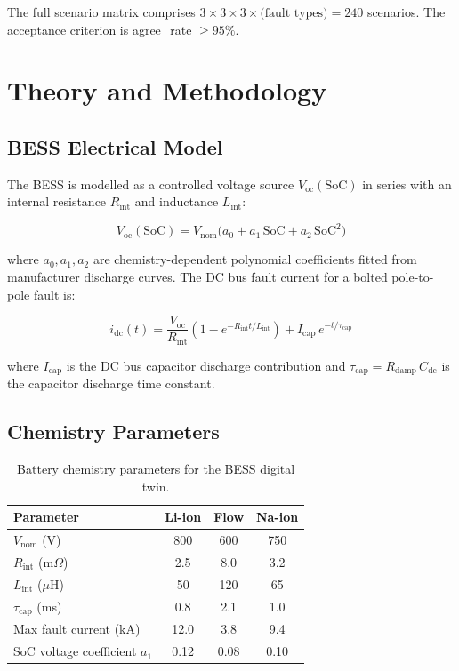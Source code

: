 \documentclass[11pt, a4paper]{article}
\begin{document}
The full scenario matrix comprises $3 \times 3 \times 3 \times \text{(fault types)}
= 240$ scenarios. The acceptance criterion is agree\_rate $\geq 95\%$.

\section{Theory and Methodology}
\label{sec:theory}

\subsection{BESS Electrical Model}

The BESS is modelled as a controlled voltage source $V_{\mathrm{oc}}(\mathrm{SoC})$
in series with an internal resistance $R_{\mathrm{int}}$ and inductance $L_{\mathrm{int}}$:

\begin{equation}
  V_{\mathrm{oc}}(\mathrm{SoC}) = V_{\mathrm{nom}}\bigl(a_0 + a_1\,\mathrm{SoC}
    + a_2\,\mathrm{SoC}^2\bigr)
  \label{eq:voc}
\end{equation}

\noindent where $a_0, a_1, a_2$ are chemistry-dependent polynomial coefficients
fitted from manufacturer discharge curves. The DC bus fault current for a
bolted pole-to-pole fault is:

\begin{equation}
  i_{\mathrm{dc}}(t) = \frac{V_{\mathrm{oc}}}{R_{\mathrm{int}}}
    \left(1 - e^{-R_{\mathrm{int}} t / L_{\mathrm{int}}}\right)
    + I_{\mathrm{cap}}\,e^{-t/\tau_{\mathrm{cap}}}
  \label{eq:dc_fault}
\end{equation}

\noindent where $I_{\mathrm{cap}}$ is the DC bus capacitor discharge contribution
and $\tau_{\mathrm{cap}} = R_{\mathrm{damp}}\,C_{\mathrm{dc}}$ is the capacitor
discharge time constant.

\subsection{Chemistry Parameters}

\begin{table}[ht]
\centering
\caption{Battery chemistry parameters for the BESS digital twin.}
\label{tab:chemistry}
\begin{tabular}{lccc}
\toprule
Parameter & Li-ion & Flow & Na-ion \\
\midrule
$V_{\mathrm{nom}}$ (V) & 800 & 600 & 750 \\
$R_{\mathrm{int}}$ (m$\Omega$) & 2.5 & 8.0 & 3.2 \\
$L_{\mathrm{int}}$ ($\mu$H) & 50 & 120 & 65 \\
$\tau_{\mathrm{cap}}$ (ms) & 0.8 & 2.1 & 1.0 \\
Max fault current (kA) & 12.0 & 3.8 & 9.4 \\
SoC voltage coefficient $a_1$ & 0.12 & 0.08 & 0.10 \\
\bottomrule
\end{tabular}
\end{table}
\end{document}

